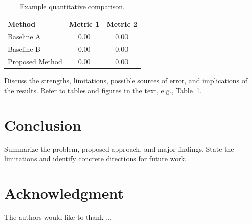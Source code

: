 \documentclass[conference]{IEEEtran}
\begin{document}
\begin{table}[t]
\caption{Example quantitative comparison.}
\label{tab:results}
\centering
\begin{tabular}{lcc}
\toprule
Method & Metric 1 & Metric 2 \\
\midrule
Baseline A & 0.00 & 0.00 \\
Baseline B & 0.00 & 0.00 \\
Proposed Method & 0.00 & 0.00 \\
\bottomrule
\end{tabular}
\end{table}

Discuss the strengths, limitations, possible sources of error, and
implications of the results. Refer to tables and figures in the text,
e.g., Table~\ref{tab:results}.

\section{Conclusion}
Summarize the problem, proposed approach, and major findings. State the
limitations and identify concrete directions for future work.

\section*{Acknowledgment}
The authors would like to thank ...

\balance


\end{document}
